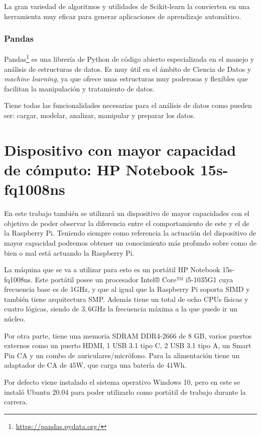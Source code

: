 \documentclass[a4paper, 12pt]{book}
\begin{document}
La gran variedad de algoritmos y utilidades de Scikit-learn la convierten en una herramienta muy eficaz para generar aplicaciones de aprendizaje automático.

\subsubsection{Pandas}
\label{subsubsec:Pandas}

Pandas\footnote{\url{https://pandas.pydata.org/}} es una librería de Python de código abierto especializada en el manejo y análisis de estructuras de datos. Es muy útil en el ámbito de Ciencia de Datos y \textit{machine learning}, ya que ofrece unas estructuras muy poderosas y flexibles que facilitan la manipulación y tratamiento de datos.

Tiene todas las funcionalidades necesarias para el análisis de datos como pueden ser: cargar, modelar, analizar, manipular y preparar los datos.


\section{Dispositivo con mayor capacidad de cómputo: HP Notebook 15s-fq1008ns}
\label{sec:portatil}

En este trabajo también se utilizará un dispositivo de mayor capacidades con el objetivo de poder observar la diferencia entre el comportamiento de este y el de la Raspberry Pi. Teniendo siempre como referencia la actuación del dispositivo de mayor capacidad podremos obtener un conocimiento más profundo sobre como de bien o mal está actuando la Raspberry Pi. 

La máquina que se va a utilizar para esto es un portátil HP Notebook 15s-fq1008ns. Este portátil posee un procesador Intel® Core™ i5-1035G1 cuya frecuencia base es de 1GHz, y que al igual que la Raspberry Pi soporta SIMD y también tiene arquitectura SMP. Además tiene un total de ocho CPUs físicas y cuatro lógicas, siendo de $3,6$GHz la frecuencia máxima a la que puede ir un núcleo. 

Por otra parte, tiene una memoria SDRAM DDR4-2666 de 8 GB, varios puertos externos como un puerto HDMI, 1 USB 3.1 tipo C, 2 USB 3.1 tipo A, un Smart Pin CA y un combo de auriculares/micrófono. Para la alimentación tiene un adaptador de CA de $45$W, que carga una batería de $41$Wh. 

Por defecto viene instalado el sistema operativo Windows 10, pero en este se instaló Ubuntu 20.04 para poder utilizarlo como portátil de trabajo durante la carrera. 
\end{document}
